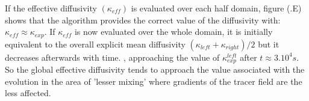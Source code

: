 If the effective diffusivity $(\kappa_{eff})$ is evaluated over each half domain, figure (.E) shows that the algorithm provides the correct value of the diffusivity with: $\kappa_{eff}\approx\kappa_{exp}$. If $\kappa_{eff}$ is now evaluated over the whole domain, it is initially equivalent to the overall explicit mean diffusivity $(\kappa_{left}+\kappa_{right})/2$ but it decreases afterwards with time. \color{red}, approaching the value of $\kappa_{exp}^{left}$ after $t \approx 3.10^4s$. So the global effective diffusivity tends to approach the value associated with the evolution in the area of 'lesser mixing' where gradients of the tracer field are the less affected.\color{black}


